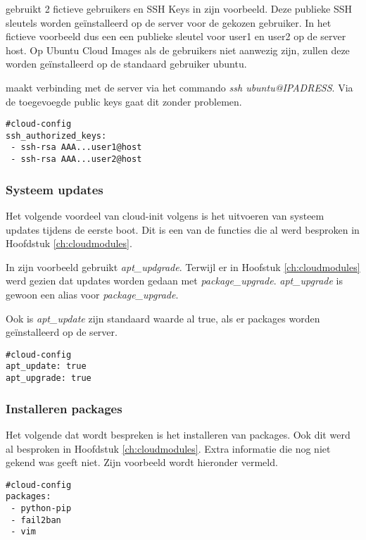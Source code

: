 \autocite{viktorpet} gebruikt 2 fictieve gebruikers en SSH Keys in zijn voorbeeld. Deze publieke SSH sleutels worden geïnstalleerd op de server voor de gekozen gebruiker. In het fictieve voorbeeld dus een een publieke sleutel voor user1 en user2 op de server host. Op Ubuntu Cloud Images als de gebruikers niet aanwezig zijn, zullen deze worden geïnstalleerd op de standaard gebruiker ubuntu. 

\autocite{viktorpet} maakt verbinding met de server via het commando \textit{ssh ubuntu@IPADRESS}. Via de toegevoegde public keys gaat dit zonder problemen.
\begin{lstlisting}[basicstyle=\small]
#cloud-config
ssh_authorized_keys:
 - ssh-rsa AAA...user1@host
 - ssh-rsa AAA...user2@host
\end{lstlisting} 


\subsubsection{Systeem updates}
Het volgende voordeel van cloud-init volgens \autocite{viktorpet} is het uitvoeren van systeem updates tijdens de eerste boot. Dit is een van de functies die al werd besproken in Hoofdstuk \ref*{ch:cloudmodules}.

In zijn voorbeeld gebruikt \autocite{viktorpet} \textit{apt\_updgrade}. Terwijl er in Hoofstuk \ref*{ch:cloudmodules} werd gezien dat updates worden gedaan met \textit{package\_upgrade}. \textit{apt\_upgrade} is gewoon een alias voor \textit{package\_upgrade}.

Ook is \textit{apt\_update} zijn standaard waarde al true, als er packages worden geïnstalleerd op de server. 
\begin{lstlisting}[basicstyle=\small]
#cloud-config
apt_update: true
apt_upgrade: true
\end{lstlisting} 

\subsubsection{Installeren packages}
Het volgende dat wordt bespreken is het installeren van packages. Ook dit werd al besproken in Hoofdstuk \ref*{ch:cloudmodules}. Extra informatie die nog niet gekend was geeft \autocite{viktorpet} niet. Zijn voorbeeld wordt hieronder vermeld.
\begin{lstlisting}[basicstyle=\small]
#cloud-config
packages:
 - python-pip
 - fail2ban
 - vim
\end{lstlisting} 

